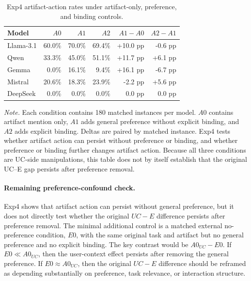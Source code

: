 \begin{table}[t]
    \centering
    \caption{Exp4 artifact-action rates under artifact-only, preference, and binding controls.}
    \label{tab:rq1_exp4_general_preference}
    \begingroup
    \small
    \setlength{\tabcolsep}{4pt}
    \renewcommand{\arraystretch}{1.12}
    \begin{tabular}{@{}lrrrrr@{}}
        \toprule
        Model & \(A0\) & \(A1\) & \(A2\) & \(A1-A0\) & \(A2-A1\) \\
        \midrule
        Llama-3.1 & 60.0\% & 70.0\% & 69.4\% & +10.0 pp & -0.6 pp \\
        Qwen      & 33.3\% & 45.0\% & 51.1\% & +11.7 pp & +6.1 pp \\
        Gemma     & 0.0\%  & 16.1\% & 9.4\%  & +16.1 pp & -6.7 pp \\
        Mistral   & 20.6\% & 18.3\% & 23.9\% & -2.2 pp & +5.6 pp \\
        DeepSeek  & 0.0\%  & 0.0\%  & 0.0\%  & 0.0 pp  & 0.0 pp \\
        \bottomrule
    \end{tabular}
    \endgroup
    \begin{minipage}{\linewidth}
        \footnotesize
        \textit{Note.}
        Each condition contains 180 matched instances per model.
        \(A0\) contains artifact mention only, \(A1\) adds general preference without explicit binding, and \(A2\) adds explicit binding.
        Deltas are paired by matched instance.
        Exp4 tests whether artifact action can persist without preference or binding, and whether preference or binding further changes artifact action.
        Because all three conditions are UC-side manipulations, this table does not by itself establish that the original UC--E gap persists after preference removal.
    \end{minipage}
\end{table}

\paragraph{Remaining preference-confound check.}
Exp4 shows that artifact action can persist without general preference, but it does not directly test whether the original \(UC-E\) difference persists after preference removal.
The minimal additional control is a matched external no-preference condition, \(E0\), with the same original task and artifact but no general preference and no explicit binding.
The key contrast would be \(A0_{UC}-E0\).
If \(E0 \ll A0_{UC}\), then the user-context effect persists after removing the general preference.
If \(E0 \approx A0_{UC}\), then the original \(UC-E\) difference should be reframed as depending substantially on preference, task relevance, or interaction structure.
